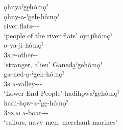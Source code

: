 
\ex ǫhnyaˀge̱hó:nǫˀ\\
\gll ǫhny-a-ˀgeh-hó:nǫˀ\\
 river.flats-{\joinerA}-{\on}-{\populative}\\
\glt `people of the river flats'
\ex oyajihó:nǫˀ\\
\gll o-ya-ji-hó:nǫˀ\\
 \textsc{3s.p}-other-{\intensifier}-\exsc{\populative}\\
\glt `stranger, alien'
\ex Ganeda̱ˀgehó:nǫˀ\\
\gll ga-ned-a̱-ˀgeh-hó:nǫˀ\\
 \textsc{3s.a}-valley-{\joinerA}-{\on}-{\populative}\\
\glt `Lower End People'
\ex hadihǫwaˀge̱hó:nǫˀ\\
\gll hadi-hǫw-a-ˀge̱-hó:nǫˀ\\
 \textsc{3ns.m.a}-boat-{\joinerA}-{\on}-{\populative}\\
\glt `sailors, navy men, merchant marines'
\z
\z

